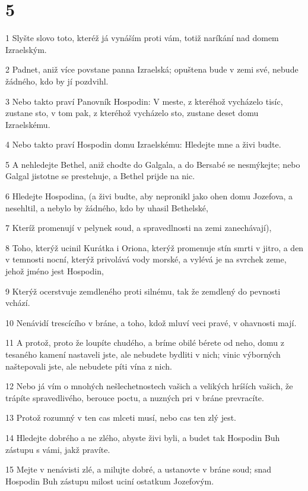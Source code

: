 \chapter{5}

\par 1 Slyšte slovo toto, kteréž já vynáším proti vám, totiž naríkání nad domem Izraelským.
\par 2 Padnet, aniž více povstane panna Izraelská; opuštena bude v zemi své, nebude žádného, kdo by jí pozdvihl.
\par 3 Nebo takto praví Panovník Hospodin: V meste, z kteréhož vycházelo tisíc, zustane sto, v tom pak, z kteréhož vycházelo sto, zustane deset domu Izraelskému.
\par 4 Nebo takto praví Hospodin domu Izraelskému: Hledejte mne a živi budte.
\par 5 A nehledejte Bethel, aniž chodte do Galgala, a do Bersabé se nesmýkejte; nebo Galgal jistotne se prestehuje, a Bethel prijde na nic.
\par 6 Hledejte Hospodina, (a živi budte, aby nepronikl jako ohen domu Jozefova, a nesehltil, a nebylo by žádného, kdo by uhasil Bethelské,
\par 7 Kteríž promenují v pelynek soud, a spravedlnosti na zemi zanechávají),
\par 8 Toho, kterýž ucinil Kurátka i Oriona, kterýž promenuje stín smrti v jitro, a den v temnosti nocní, kterýž privolává vody morské, a vylévá je na svrchek zeme, jehož jméno jest Hospodin,
\par 9 Kterýž ocerstvuje zemdleného proti silnému, tak že zemdlený do pevnosti vchází.
\par 10 Nenávidí trescícího v bráne, a toho, kdož mluví veci pravé, v ohavnosti mají.
\par 11 A protož, proto že loupíte chudého, a bríme obilé bérete od neho, domu z tesaného kamení nastaveli jste, ale nebudete bydliti v nich; vinic výborných naštepovali jste, ale nebudete píti vína z nich.
\par 12 Nebo já vím o mnohých nešlechetnostech vašich a velikých hríších vašich, že trápíte spravedlivého, berouce poctu, a nuzných pri v bráne prevracíte.
\par 13 Protož rozumný v ten cas mlceti musí, nebo cas ten zlý jest.
\par 14 Hledejte dobrého a ne zlého, abyste živi byli, a budet tak Hospodin Buh zástupu s vámi, jakž pravíte.
\par 15 Mejte v nenávisti zlé, a milujte dobré, a ustanovte v bráne soud; snad Hospodin Buh zástupu milost uciní ostatkum Jozefovým.
